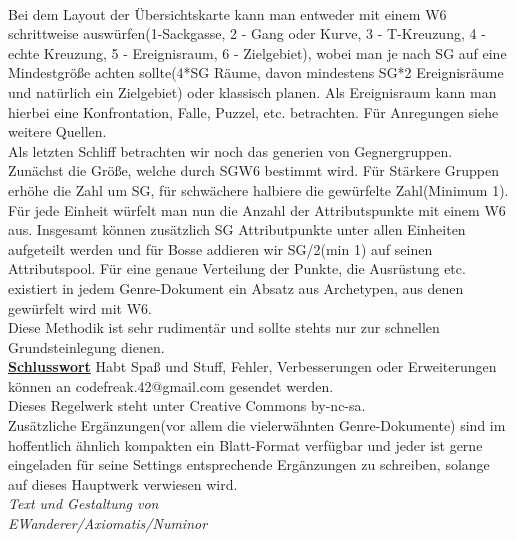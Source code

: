 \documentclass[twoside,a4paper]{minimal}
\begin{document}
\begin{multicols*}{3}
\\Bei dem Layout der Übersichtskarte kann man entweder mit einem W6 schrittweise auswürfen(1-Sackgasse, 2 - Gang oder Kurve, 3 - T-Kreuzung, 4 - echte Kreuzung, 5 - Ereignisraum, 6 - Zielgebiet), wobei man je nach SG auf eine Mindestgröße achten sollte(4*SG Räume, davon mindestens SG*2 Ereignisräume und natürlich ein Zielgebiet) oder klassisch planen. Als Ereignisraum kann man hierbei eine Konfrontation, Falle, Puzzel, etc. betrachten. Für Anregungen siehe weitere Quellen.
\\Als letzten Schliff betrachten wir noch das generien von Gegnergruppen. Zunächst die Größe, welche durch SGW6 bestimmt wird. Für Stärkere Gruppen erhöhe die Zahl um SG, für schwächere halbiere die gewürfelte Zahl(Minimum 1). Für jede Einheit würfelt man nun die Anzahl der Attributspunkte mit einem W6 aus. Insgesamt können zusätzlich SG Attributpunkte unter allen Einheiten aufgeteilt werden und für Bosse addieren wir SG/2(min 1) auf seinen Attributspool. Für eine genaue Verteilung der Punkte, die Ausrüstung etc. existiert in jedem Genre-Dokument ein Absatz aus Archetypen, aus denen gewürfelt wird mit W6.
\\Diese Methodik ist sehr rudimentär und sollte stehts nur zur schnellen Grundsteinlegung dienen.
\textbf{\uline{\\Schlusswort}}
Habt Spaß und Stuff, Fehler, Verbesserungen oder Erweiterungen können an codefreak.42@gmail.com gesendet werden. 
\\Dieses Regelwerk steht unter Creative Commons by-nc-sa.
\\Zusätzliche Ergänzungen(vor allem die vielerwähnten Genre-Dokumente) sind im hoffentlich ähnlich kompakten ein Blatt-Format verfügbar und jeder ist gerne eingeladen für seine Settings entsprechende Ergänzungen zu schreiben, solange auf dieses Hauptwerk verwiesen wird. 
\textit{\\Text und Gestaltung von\\EWanderer/Axiomatis/Numinor}
\end{multicols*}
\end{document}

